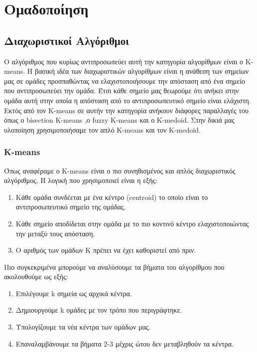 \chapter{Ομαδοποίηση}
\section{Διαχωριστικοί Αλγόριθμοι}

Ο αλγόριθμος που κυρίως αντιπροσωπεύει αυτή την κατηγορία αλγορίθμων είναι ο K-means. Η βασική ιδέα των διαχωριστικών αλγορίθμων είναι η ανάθεση των σημείων μας σε ομάδες προσπαθώντας να ελαχιστοποιήσουμε την απόσταση από ένα σημείο που αντιπροσωπεύει την ομάδα. Έτσι κάθε σημείο μας θεωρούμε ότι ανήκει στην ομάδα αυτή στην οποία η απόσταση από το αντιπροσωπευτικό σημείο είναι ελάχιστη. Εκτός από τον K-means σε αυτήν την κατηγορία ανήκουν διάφορες παραλλαγές του όπως ο bisection K-means ,ο fuzzy Κ-means και ο K-medoid. Στην δικιά μας υλοποίηση χρησιμοποιήσαμε τον απλό K-means και τον K-medoid.

\subsection{K-means}

Όπως αναφέραμε ο K-means είναι ο πιο συνηθισμένος και απλός διαχωριστικός αλγόριθμος. Η λογική που χρησιμοποιεί είναι η εξής:
\begin{enumerate}
	\item Κάθε ομάδα συνδέεται με ένα κέντρο (centroid) το οποίο είναι το αντιπροσωπευτικό σημείο της ομάδας.
	\item Κάθε σημείο αποδίδεται στην ομάδα με το πιο κοντινό κέντρο ελαχιστοποιώντας την μεταξύ τους απόσταση. 
	\item Ο αριθμός των ομάδων Κ πρέπει να έχει καθοριστεί από πριν.
\end{enumerate}

Πιο συγκεκριμένα μπορούμε να αναλύσουμε τα βήματα του αλγορίθμου που ακολουθούμε ως εξής:
\begin{enumerate}
	\item Επιλέγουμε k σημεία ως αρχικά κέντρα.
	\item Δημιουργούμε k ομάδες με τον τρόπο που περιγράφτηκε.
	\item Υπολογίζουμε τα νέα κέντρα των ομάδων μας.
	\item Επαναλαμβάνουμε τα βήματα 2-3 μέχρις ώτου δεν μεταβληθούν τα κέντρα.
\end{enumerate}

